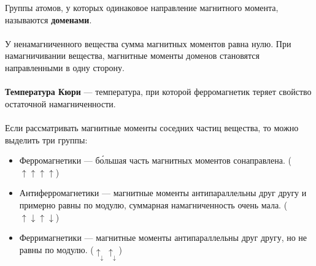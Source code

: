 \documentclass[dvipdfmx]{article}
\begin{document}
Группы атомов, у которых одинаковое направление магнитного момента, называются \textbf{доменами}.

\noindent{}
\paragraph{}

У ненамагниченного вещества сумма магнитных моментов равна нулю. При намагничивании вещества,
магнитные моменты доменов становятся направленными в одну сторону.

\paragraph{}

\textbf{Температура Кюри} --- температура, при которой ферромагнетик теряет свойство остаточной намагниченности.

\paragraph{}

Если рассматривать магнитные моменты соседних частиц вещества, то можно выделить три группы:

\begin{itemize}
\item
  Ферромагнетики --- б\'{о}льшая часть магнитных моментов сонаправлена. ($\uparrow \uparrow \uparrow \uparrow$)
\item
  Антиферромагнетики --- магнитные моменты антипараллельны друг другу и примерно равны по модулю,
  суммарная намагниченность очень мала. ($\uparrow \downarrow \uparrow \downarrow$)
\item
  Ферримагнетики --- магнитные моменты антипараллельны друг другу, но не равны по модулю.
  ($\uparrow_\downarrow\uparrow_\downarrow$)
\end{itemize}
\end{document}
